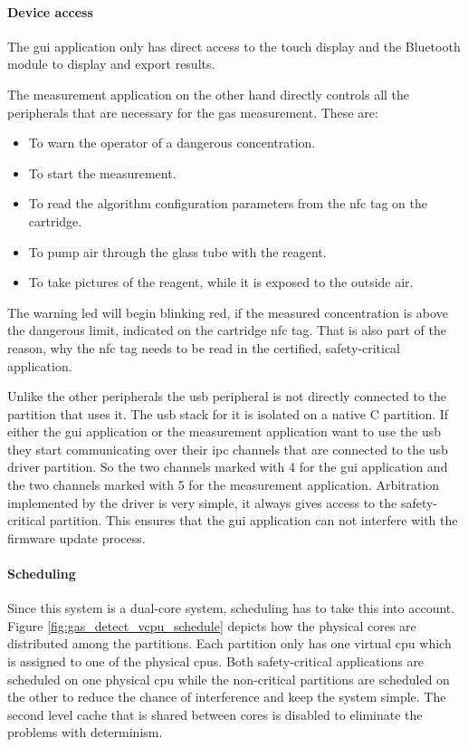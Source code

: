 \paragraph{Device access}
The \acrshort{gui} application only has direct access to the touch display and the Bluetooth module to display and export results.

The measurement application on the other hand directly controls all the peripherals that are necessary for the gas measurement. These are:
\begin{itemize}
    \item {} To warn the operator of a dangerous concentration.
    \item {} To start the measurement.
    \item {} To read the algorithm configuration parameters from the \acrshort{nfc} tag on the cartridge.
    \item {} To pump air through the glass tube with the reagent.
    \item {} To take pictures of the reagent, while it is exposed to the outside air.
\end{itemize}
The warning \acrshort{led} will begin blinking red, if the measured concentration is above the dangerous limit, indicated on the cartridge \acrshort{nfc} tag. That is also part of the reason, why the \acrshort{nfc} tag needs to be read in the certified, safety-critical application.

Unlike the other peripherals the \acrshort{usb} peripheral is not directly connected to the partition that uses it. The \acrshort{usb} stack for it is isolated on a native C partition. If either the \acrshort{gui} application or the measurement application want to use the \acrshort{usb} they start communicating over their \acrshort{ipc} channels that are connected to the \acrshort{usb} driver partition. So the two channels marked with 4 for the \acrshort{gui} application and the two channels marked with 5 for the measurement application. Arbitration implemented by the driver is very simple, it always gives access to the safety-critical partition. This ensures that the \acrshort{gui} application can not interfere with the firmware update process. 

\paragraph{Scheduling}
Since this system is a dual-core system, scheduling has to take this into account. Figure \ref{fig:gas_detect_vcpu_schedule} depicts how the physical cores are distributed among the partitions. Each partition only has one virtual \acrshort{cpu} which is assigned to one of the physical \acrshort{cpu}s. Both safety-critical applications are scheduled on one physical \acrshort{cpu} while the non-critical partitions are scheduled on the other to reduce the chance of interference and keep the system simple. The second level cache that is shared between cores is disabled to eliminate the problems with determinism. 

